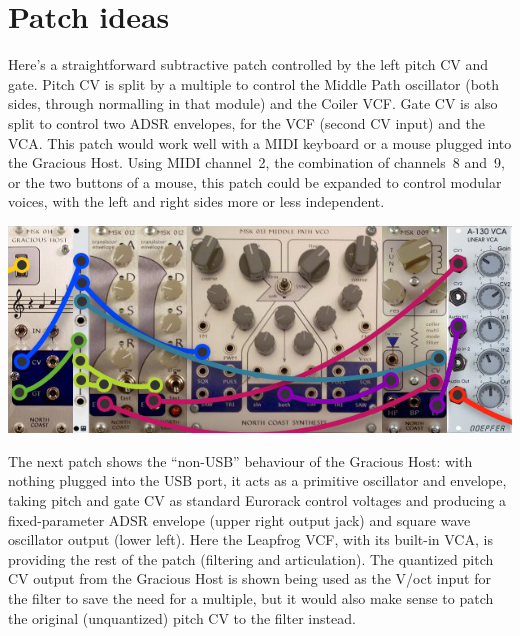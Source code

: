 
%
%
%
%
%
%

\chapter{Patch ideas}

Here's a straightforward subtractive patch controlled by the left pitch CV
and gate.  Pitch CV is split by a multiple to control the Middle Path
oscillator (both sides, through normalling in that module) and the Coiler
VCF.  Gate CV is also split to control two ADSR envelopes, for the VCF
(second CV input) and the VCA.  This patch would work well with a MIDI
keyboard or a mouse plugged into the Gracious Host.  Using MIDI channel~2,
the combination of channels~8 and~9, or the two buttons of a mouse, this
patch could be expanded to control modular voices, with the left and right
sides more or less independent.

\nopagebreak\noindent
{\hspace*{\fill}\includegraphics[scale=0.35]{patch1.png}\hspace*{\fill}\par} 

The next patch shows the ``non-USB'' behaviour of the Gracious Host:  with
nothing plugged into the USB port, it acts as a primitive oscillator and
envelope, taking pitch and gate CV as standard Eurorack control voltages and
producing a fixed-parameter ADSR envelope (upper right output jack) and
square wave oscillator output (lower left).  Here the Leapfrog VCF, with its
built-in VCA, is providing the rest of the patch (filtering and
articulation).  The quantized pitch CV output from the Gracious Host is
shown being used as the V/oct input for the filter to save the need for a
multiple, but it would also make sense to patch the original (unquantized)
pitch CV to the filter instead.

